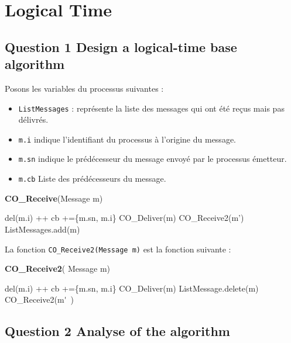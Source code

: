 \chapter{Logical Time}
\section{Question 1 Design a logical-time base algorithm}
Posons les variables du processus suivantes : 

\begin{itemize}
\item  \verb+ListMessages+ : représente la liste des messages qui ont été reçus mais pas délivrés.
\item \verb+m.i+ indique l'identifiant du processus à l'origine du message.
\item \verb+m.sn+ indique le prédécesseur du message envoyé par le processus émetteur.
\item \verb+m.cb+ Liste des prédécesseurs du message.
\end{itemize}

\begin{algorithm}
  \caption{\textbf{CO\_Receive}(Message m)}
  \label{algo:receive}
  \begin{algorithmic}[1]
    \STATE  del(m.i) ++
    \STATE  cb +=\{m.sn, m.i\}
    \STATE  CO\_Deliver(m)
    \STATE CO\_Receive2(m')
    \ENDFOR
    \ELSE
    \STATE ListMessages.add(m)
    \ENDIF
  \end{algorithmic}
\end{algorithm}


La fonction \verb+CO_Receive2(Message m)+ est la fonction suivante : 
\begin{algorithm}
  \caption{\textbf{CO\_Receive2}( Message m)}
  \label{algo:receive2}
  \begin{algorithmic}[1]
    \STATE  del(m.i) ++
    \STATE  cb +=\{m.sn, m.i\}
    \STATE  CO\_Deliver(m)
    \STATE  ListMessage.delete(m)
    \STATE CO\_Receive2(m\'~)
    \ENDFOR
    \ENDIF
  \end{algorithmic}
\end{algorithm}


\section{Question 2 Analyse of the algorithm}

